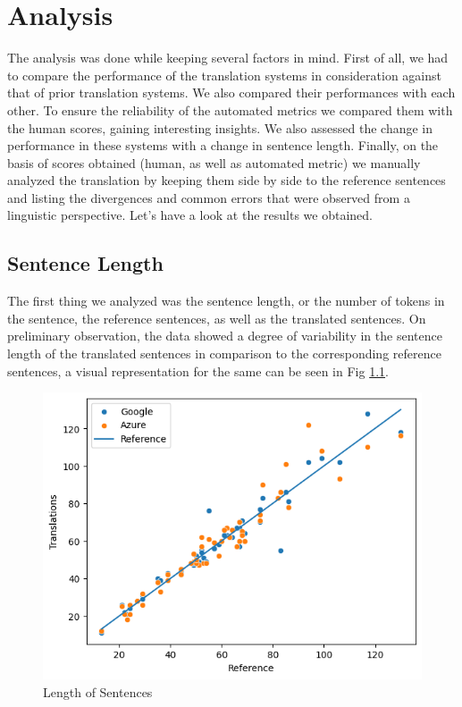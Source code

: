 \chapter{Analysis}

The analysis was done while keeping several factors in mind. First of all, we had to compare the performance of the translation systems in consideration against that of prior translation systems. We also compared their performances with each other. To ensure the reliability of the automated metrics we compared them with the human scores, gaining interesting insights. We also assessed the change in performance in these systems with a change in sentence length. Finally, on the basis of scores obtained (human, as well as automated metric) we manually analyzed the translation by keeping them side by side to the reference sentences and listing the divergences and common errors that were observed from a linguistic perspective. Let's have a look at the results we obtained.

\section{Sentence Length}

The first thing we analyzed was the sentence length, or the number of tokens in the sentence, the reference sentences, as well as the translated sentences. On preliminary observation, the data showed a degree of variability in the sentence length of the translated sentences in comparison to the corresponding reference sentences, a visual representation for the same can be seen in Fig \ref{fig:sen-len}.

\vspace{0.2cm}

\begin{figure}[h]
    \centering
    \includegraphics[width=0.8\linewidth]{images/sen_len.png}
    \caption{Length of Sentences}
    \label{fig:sen-len}
\end{figure}

